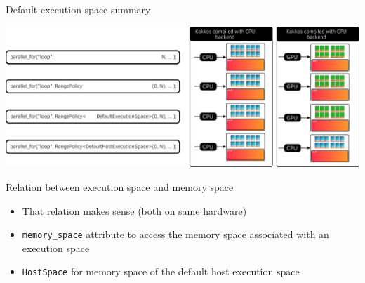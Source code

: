 \documentclass[
    aspectratio=169,
    handout,
]{beamer}
\begin{document}

\begin{frame}{Default execution space summary}
    \begin{center}
        \includegraphics[width=\textwidth]{default_execution_space.png}
    \end{center}
\end{frame}


\begin{frame}[fragile]{Relation between execution space and memory space}
    \begin{itemize}
        \item That relation makes sense (both on same hardware)
        \item \texttt{memory\_space} attribute to access the memory space associated with an execution space
        \item \texttt{HostSpace} for memory space of the default host execution space
    \end{itemize}
    \begin{center}
    \end{center}
\end{frame}
\end{document}

